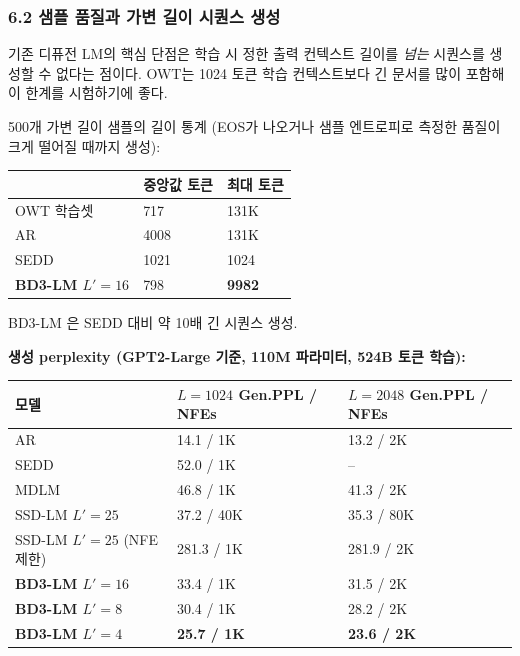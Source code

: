 \documentclass[
]{article}
\begin{document}
\hypertarget{uxc0d8uxd50c-uxd488uxc9c8uxacfc-uxac00uxbcc0-uxae38uxc774-uxc2dcuxd000uxc2a4-uxc0dduxc131}{%
\subsubsection{6.2 샘플 품질과 가변 길이 시퀀스
생성}\label{uxc0d8uxd50c-uxd488uxc9c8uxacfc-uxac00uxbcc0-uxae38uxc774-uxc2dcuxd000uxc2a4-uxc0dduxc131}}

기존 디퓨전 LM의 핵심 단점은 학습 시 정한 출력 컨텍스트 길이를
\emph{넘는} 시퀀스를 생성할 수 없다는 점이다. OWT는 1024 토큰 학습
컨텍스트보다 긴 문서를 많이 포함해 이 한계를 시험하기에 좋다.

500개 가변 길이 샘플의 길이 통계 (EOS가 나오거나 샘플 엔트로피로 측정한
품질이 크게 떨어질 때까지 생성):

\begin{longtable}[]{@{}lll@{}}
\toprule()
& 중앙값 토큰 & 최대 토큰 \\
\midrule()
\endhead
OWT 학습셋 & 717 & 131K \\
AR & 4008 & 131K \\
SEDD & 1021 & 1024 \\
\textbf{BD3-LM \(L'=16\)} & 798 & \textbf{9982} \\
\bottomrule()
\end{longtable}

BD3-LM 은 SEDD 대비 약 10배 긴 시퀀스 생성.

\textbf{생성 perplexity (GPT2-Large 기준, 110M 파라미터, 524B 토큰
학습):}

\begin{longtable}[]{@{}lll@{}}
\toprule()
모델 & \(L=1024\) Gen.PPL / NFEs & \(L=2048\) Gen.PPL / NFEs \\
\midrule()
\endhead
AR & 14.1 / 1K & 13.2 / 2K \\
SEDD & 52.0 / 1K & -- \\
MDLM & 46.8 / 1K & 41.3 / 2K \\
SSD-LM \(L'=25\) & 37.2 / 40K & 35.3 / 80K \\
SSD-LM \(L'=25\) (NFE 제한) & 281.3 / 1K & 281.9 / 2K \\
\textbf{BD3-LM \(L'=16\)} & 33.4 / 1K & 31.5 / 2K \\
\textbf{BD3-LM \(L'=8\)} & 30.4 / 1K & 28.2 / 2K \\
\textbf{BD3-LM \(L'=4\)} & \textbf{25.7 / 1K} & \textbf{23.6 / 2K} \\
\bottomrule()
\end{longtable}
\end{document}
